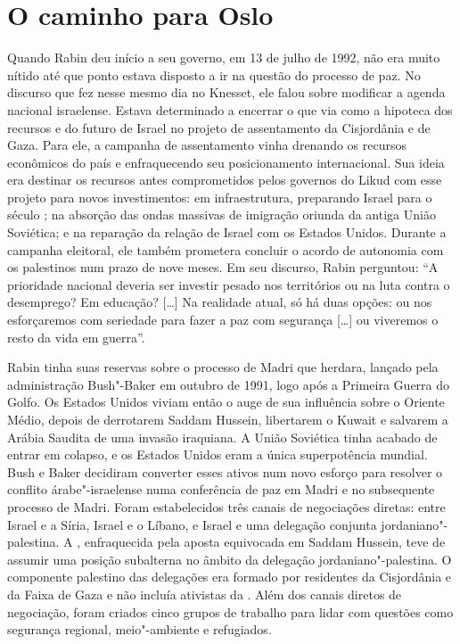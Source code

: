 \section{O caminho para Oslo}

Quando Rabin deu início a seu governo, em 13 de julho de 1992, não
era muito nítido até que ponto estava disposto a ir na questão do processo
de paz. No discurso que fez nesse mesmo dia no Knesset, ele falou sobre
modificar a agenda nacional israelense. Estava determinado a encerrar o
que via como a hipoteca dos recursos e do futuro de Israel no projeto de
assentamento da Cisjordânia e de Gaza. Para ele, a campanha de
assentamento vinha drenando os recursos econômicos do país e
enfraquecendo seu posicionamento internacional. Sua ideia era destinar
os recursos antes comprometidos pelos governos do Likud com esse projeto
para novos investimentos: em infraestrutura, preparando Israel para o
século ; na absorção das ondas massivas de imigração oriunda da
antiga União Soviética; e na reparação da relação de Israel com os
Estados Unidos. Durante a campanha eleitoral, ele também prometera
concluir o acordo de autonomia com os palestinos num prazo de nove
meses. Em seu discurso, Rabin perguntou: ``A prioridade nacional deveria
ser investir pesado nos territórios ou na luta contra o desemprego? Em
educação? {[}\ldots{}{]} Na realidade atual, só há duas opções: ou nos esforçaremos
com seriedade para fazer a paz com segurança {[}\ldots{}{]} ou viveremos o resto da
vida em guerra''.

Rabin tinha suas reservas sobre o processo de Madri que herdara, lançado
pela administração Bush"-Baker em outubro de 1991, logo após a Primeira
Guerra do Golfo. Os Estados Unidos viviam então o auge de sua influência
sobre o Oriente Médio, depois de derrotarem Saddam Hussein, libertarem o
Kuwait e salvarem a Arábia Saudita de uma invasão iraquiana. A União
Soviética tinha acabado de entrar em colapso, e os Estados Unidos eram a
única superpotência mundial. Bush e Baker decidiram converter esses
ativos num novo esforço para resolver o conflito árabe"-israelense numa
conferência de paz em Madri e no subsequente processo de Madri. Foram
estabelecidos três canais de negociações diretas: entre Israel e a
Síria, Israel e o Líbano, e Israel e uma delegação conjunta
jordaniano"-palestina. A , enfraquecida pela aposta equivocada em
Saddam Hussein, teve de assumir uma posição subalterna no âmbito da
delegação jordaniano"-palestina. O componente palestino das delegações
era formado por residentes da Cisjordânia e da Faixa de Gaza e não
incluía ativistas da . Além dos canais diretos de negociação, foram
criados cinco grupos de trabalho para lidar com questões como segurança
regional, meio"-ambiente e refugiados.

